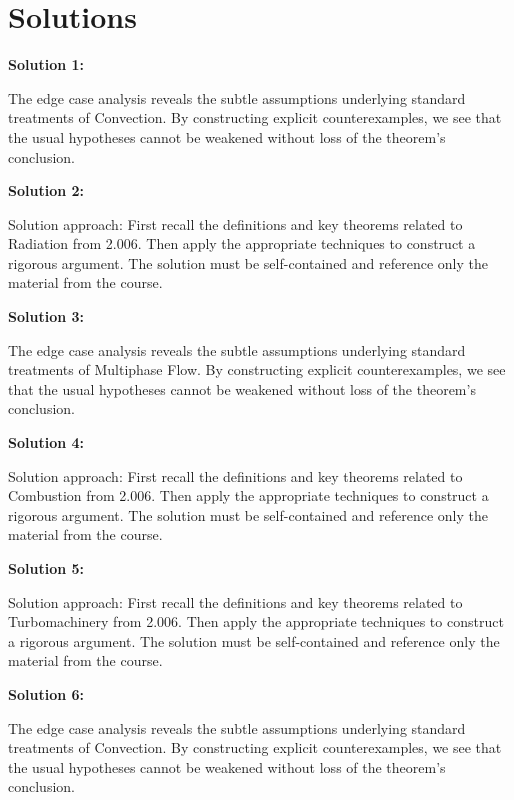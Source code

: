 \documentclass[12pt,a4paper]{exam}
\begin{document}
\newpage
\section*{Solutions}

\textbf{Solution 1:}

The edge case analysis reveals the subtle assumptions underlying standard treatments of Convection. By constructing explicit counterexamples, we see that the usual hypotheses cannot be weakened without loss of the theorem's conclusion.

\vspace{0.5cm}

\textbf{Solution 2:}

Solution approach: First recall the definitions and key theorems related to Radiation from 2.006. Then apply the appropriate techniques to construct a rigorous argument. The solution must be self-contained and reference only the material from the course.

\vspace{0.5cm}

\textbf{Solution 3:}

The edge case analysis reveals the subtle assumptions underlying standard treatments of Multiphase Flow. By constructing explicit counterexamples, we see that the usual hypotheses cannot be weakened without loss of the theorem's conclusion.

\vspace{0.5cm}

\textbf{Solution 4:}

Solution approach: First recall the definitions and key theorems related to Combustion from 2.006. Then apply the appropriate techniques to construct a rigorous argument. The solution must be self-contained and reference only the material from the course.

\vspace{0.5cm}

\textbf{Solution 5:}

Solution approach: First recall the definitions and key theorems related to Turbomachinery from 2.006. Then apply the appropriate techniques to construct a rigorous argument. The solution must be self-contained and reference only the material from the course.

\vspace{0.5cm}

\textbf{Solution 6:}

The edge case analysis reveals the subtle assumptions underlying standard treatments of Convection. By constructing explicit counterexamples, we see that the usual hypotheses cannot be weakened without loss of the theorem's conclusion.
\end{document}
